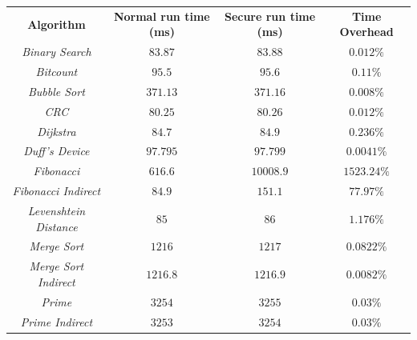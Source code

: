 \begin{table}
  \centering
  \begin{tabular}{|c|c|c|c|}
    \hline
    \textbf{Algorithm}                   & \textbf{Normal run time (ms)} & \textbf{Secure run time (ms)} & \textbf{Time Overhead} \\
    \hhline{====} \textit{Binary Search} & $83.87$                       & $83.88$                       & $0.012\%$              \\
    \hline
    \textit{Bitcount}                    & $95.5$                        & $95.6$                        & $0.11\%$               \\
    \hline
    \textit{Bubble Sort}                 & $371.13$                      & $371.16$                      & $0.008\%$              \\
    \hline
    \textit{CRC}                         & $80.25$                       & $80.26$                       & $0.012\%$              \\
    \hline
    \textit{Dijkstra}                    & $84.7$                        & $84.9$                        & $0.236\%$              \\
    \hline
    \textit{Duff's Device}               & $97.795$                      & $97.799$                      & $0.0041\%$             \\
    \hline
    \textit{Fibonacci}                   & $616.6$                       & $10008.9$                     & $1523.24\%$            \\
    \hline
    \textit{Fibonacci Indirect}          & $84.9$                        & $151.1$                       & $77.97\%$              \\
    \hline
    \textit{Levenshtein Distance}        & $85$                          & $86$                          & $1.176\%$              \\
    \hline
    \textit{Merge Sort}                  & $1216$                        & $1217$                        & $0.0822\%$             \\
    \hline
    \textit{Merge Sort Indirect}         & $1216.8$                      & $1216.9$                      & $0.0082\%$             \\
    \hline
    \textit{Prime}                       & $3254$                        & $3255$                        & $0.03\%$               \\
    \hline
    \textit{Prime Indirect}              & $3253$                        & $3254$                        & $0.03\%$               \\

\end{tabular}
\end{table}

